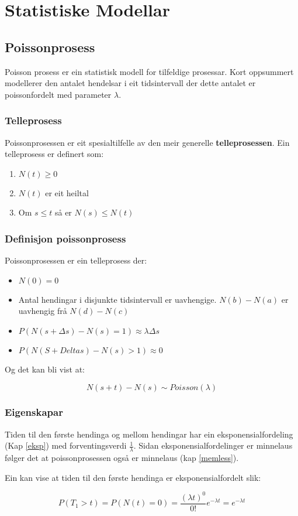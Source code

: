 \chapter{Statistiske Modellar}

\section{Poissonprosess}
Poisson prosess er ein statistisk modell for tilfeldige prosessar. Kort oppsummert modellerer den antalet hendelsar i eit tidsintervall der dette antalet er poissonfordelt med parameter $\lambda$.

\subsection{Telleprosess}
Poissonprosessen er eit spesialtilfelle av den meir generelle \textbf{telleprosessen}. Ein telleprosess er definert som:

\begin{enumerate}
    \item $N(t) \geq 0$ 
    \item $N(t)$ er eit heiltal
    \item Om $s \leq t$ så er $N(s) \leq N(t)$
\end{enumerate}

\subsection{Definisjon poissonprosess}
Poissonprosessen er ein telleprosess der:

\begin{itemize}
    \item $N(0) = 0$
    \item Antal hendingar i disjunkte tidsintervall er uavhengige. $N(b) - N(a)$ er uavhengig frå $N(d) - N(c)$
    \item $P(N(s + \Delta s) - N(s) = 1) \approx \lambda \Delta s$
    \item $P(N(S + Delta s) - N(s) > 1) \approx 0$
\end{itemize}

Og det kan bli vist at:

\begin{equation}
    N(s + t) - N(s) \sim Poisson(\lambda)
\end{equation}

\subsection{Eigenskapar}
Tiden til den første hendinga og mellom hendingar har ein eksponensialfordeling (Kap \ref{eksp}) med forventingsverdi $\frac{1}{\lambda}$. Sidan eksponensialfordelinger er minnelaus følger det at poissonprosessen også er minnelaus (kap \ref{memless}).

Ein kan vise at tiden til den første hendinga er eksponensialfordelt slik:

\begin{equation}
    P(T_1 > t) = P(N(t) = 0) = \frac{(\lambda t)^0}{0!}e^{-\lambda t} = e^{-\lambda t}
\end{equation}

